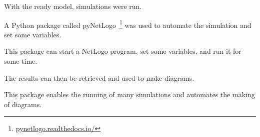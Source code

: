 With the ready model, simulations were run.

A Python package called pyNetLogo~\footnote{\url{pynetlogo.readthedocs.io/}} was used to automate the simulation and set some variables.

This package can start a NetLogo program, set some variables, and run it for some time.

The results can then be retrieved and used to make diagrams.

This package enables the running of many simulations and automates the making of diagrams.




















